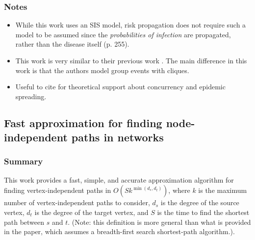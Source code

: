 \subsubsection*{Notes}
\begin{itemize}
\item While this work uses an SIS model, risk propagation does not require such a model to be assumed since the \emph{probabilities of infection} are propagated, rather than the disease itself (p. 255).
\item This work is very similar to their previous work \cite{Onaga2017}. The main difference in this work is that the authors model group events with cliques.
\item Useful to cite for theoretical support about concurrency and epidemic spreading.
\end{itemize}

\subsection{Fast approximation for finding node-independent paths in networks}
\subsubsection*{Summary}
This work provides a fast, simple, and accurate approximation algorithm for finding vertex-independent paths in $O(S k^{\min(d_s, d_t)})$, where $k$ is the maximum number of vertex-independent paths to consider, $d_s$ is the degree of the source vertex, $d_t$ is the degree of the target vertex, and $S$ is the time to find the shortest path between $s$ and $t$. (Note: this definition is more general than what is provided in the paper, which assumes a breadth-first search shortest-path algorithm.).
